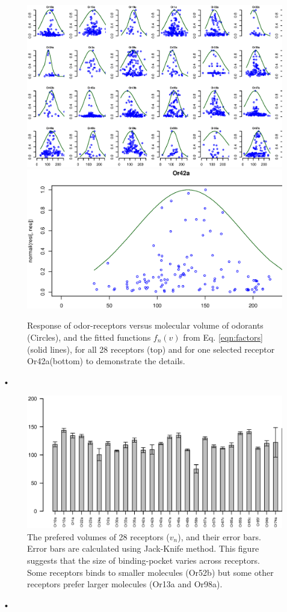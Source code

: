 \documentclass[11pt]{paper} %
\begin{document}
\begin{figure}
	\centering
	\includegraphics[width=\textwidth]{fig/vol-res}
	\includegraphics[width=0.75 \textwidth]{fig/vol-res-Or42a}
	\caption{Response of odor-receptors  versus molecular volume of odorants (Circles), and the fitted functions $f_n(v)$ from Eq. \ref{eqn:factors} (solid lines), 
	for all 28 receptors (top) and for one selected receptor Or42a(bottom) to demonstrate the details. }
	\label{fig:vol-res}
\end{figure}•

\begin{figure}
	\includegraphics[width=\textwidth]{fig/mean-vol}
	\caption{The prefered volumes of 28 receptors ($v_n$), and their error bars. Error bars are calculated using Jack-Knife method. 
	This figure suggests that the size of binding-pocket varies across receptors. 
	Some receptors binds to smaller molecules (Or52b) but some other receptors prefer larger molecules (Or13a and Or98a).}
	\label{fig:preferred_volume}
\end{figure}•
\end{document}
